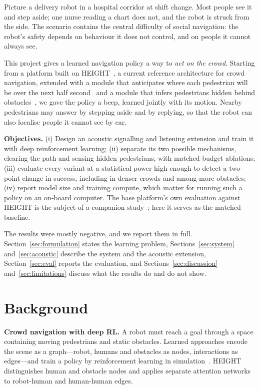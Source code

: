 \documentclass[conference]{IEEEtran}
\begin{document}
Picture a delivery robot in a hospital corridor at shift change. Most people see it and
step aside; one nurse reading a chart does not, and the robot is struck from the side. The
scenario contains the central difficulty of social navigation: the robot's safety depends on
behaviour it does not control, and on people it cannot always see.

This project gives a learned navigation policy a way to \emph{act on the crowd}. Starting from
a platform built on HEIGHT~\cite{height}, a current reference architecture for crowd navigation,
extended with a module that anticipates where each pedestrian will be over the next half
second~\cite{intention} and a module that infers pedestrians hidden behind obstacles~\cite{pas},
we gave the policy a beep, learned jointly with its motion. Nearby pedestrians may answer by
stepping aside and by replying, so that the robot can also localise people it cannot see by ear.

\textbf{Objectives.} (i) Design an acoustic signalling and listening extension and train it with
deep reinforcement learning; (ii) separate its two possible mechanisms, clearing the path and
sensing hidden pedestrians, with matched-budget ablations; (iii) evaluate every variant at a
statistical power high enough to detect a two-point change in success, including in denser
crowds and among more obstacles; (iv) report model size and training compute, which matter for
running such a policy on an on-board computer. The base platform's own evaluation against HEIGHT
is the subject of a companion study~\cite{companion}; here it serves as the matched baseline.

The results were mostly negative, and we report them in full. Section~\ref{sec:formulation}
states the learning problem, Sections~\ref{sec:system} and~\ref{sec:acoustic} describe the
system and the acoustic extension, Section~\ref{sec:eval} reports the evaluation, and
Sections~\ref{sec:discussion} and~\ref{sec:limitations} discuss what the results do and do not
show.

\section{Background}

\textbf{Crowd navigation with deep RL.} A robot must reach a goal through a space containing
moving pedestrians and static obstacles. Learned approaches encode the scene as a
graph---robot, humans and obstacles as nodes, interactions as edges---and train a policy by
reinforcement learning in simulation~\cite{dsrnn,intention,height}. HEIGHT~\cite{height}
distinguishes human and obstacle nodes and applies separate attention networks to robot-human
and human-human edges.
\end{document}
